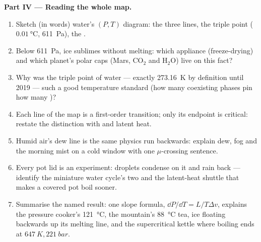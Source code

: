 \begin{problem}
\medskip\noindent\textbf{Part IV --- Reading the whole map.}
\begin{enumerate}[resume]
  \item Sketch (in words) water's $(P, T)$ diagram: the three
        lines, the triple point ($\qty{0.01}{\celsius}$,
        \qty{611}{Pa}), the .
  \item Below \qty{611}{Pa}, ice sublimes without melting: which
        appliance (freeze-drying) and which planet's polar caps
        (Mars, CO$_2$ and H$_2$O) live on this fact?
  \item Why was the triple point of water --- exactly
        \qty{273.16}{K} by definition until 2019 --- such a good
        temperature standard (how many coexisting phases pin how
        many )?
  \item Each line of the map is a first-order transition; only
        its endpoint is critical: restate the distinction with
         and latent heat.
  \item Humid air's dew line is the same physics run backwards:
        explain dew, fog and the morning mist on a cold window
        with one $\mu$-crossing sentence.
  \item Every pot lid is an experiment: droplets condense on it
        and rain back --- identify the miniature water cycle's
        two  and the latent-heat shuttle that
        makes a covered pot boil sooner.
  \item Summarise the named result: one slope formula, $\dd P/
        \dd T = L/T\Delta v$, explains the pressure cooker's
        \qty{121}{\celsius}, the mountain's \qty{88}{\celsius}
        tea, ice floating backwards up its melting line, and the
        supercritical kettle where boiling ends at
        $\qty{647}{K}, \qty{221}{bar}$.
\end{enumerate}
\end{problem}
